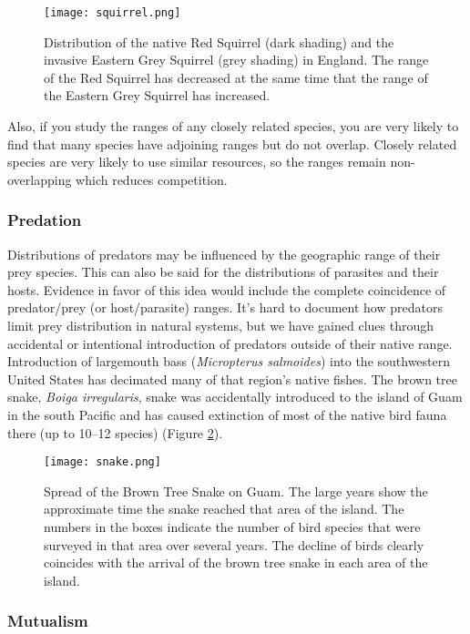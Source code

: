 \documentclass[11pt, hidelinks]{article}
\begin{document}
\begin{figure}[hb]
	\centering
	\texttt{[image: squirrel.png]}
	\caption{Distribution of the native Red Squirrel (dark shading) and the invasive Eastern Grey Squirrel (grey shading) in England. The range of the Red Squirrel has decreased at the same time that the range of the Eastern Grey Squirrel has increased.\label{squirrel}}
\end{figure}

Also, if you study the ranges of any closely related species, you are very likely to find that many species have adjoining ranges but do not overlap.  Closely related species are very likely to use similar resources, so the ranges remain non-overlapping which reduces competition. 

\subsubsection{Predation}
Distributions of predators may be influenced by the geographic range of their prey species. This can also be said for the distributions of parasites and their hosts. Evidence in favor of this idea would include the complete coincidence of predator/prey (or host/parasite) ranges. It's hard to document how predators limit prey distribution in natural systems, but we have gained clues through accidental or intentional introduction of predators outside of their native range. Introduction of largemouth bass (\emph{Micropterus salmoides}) into the southwestern United States has decimated many of that region's native fishes.  The brown tree snake, \emph{Boiga irregularis}, snake was accidentally introduced  to the island of Guam in the south Pacific and has caused extinction of most of the native bird fauna there (up to 10--12 species) (Figure \ref{brown tree snake}). 

\begin{figure}
	\centering
	\texttt{[image: snake.png]}
	\caption{Spread of the Brown Tree Snake on Guam. The large years show the approximate time the snake reached that area of the island. The numbers in the boxes indicate the number of bird species that were surveyed in that area over several years. The decline of birds clearly coincides with the arrival of the brown tree snake in each area of the island.\label{brown tree snake}}
\end{figure}


\subsubsection{Mutualism}
\end{document}
